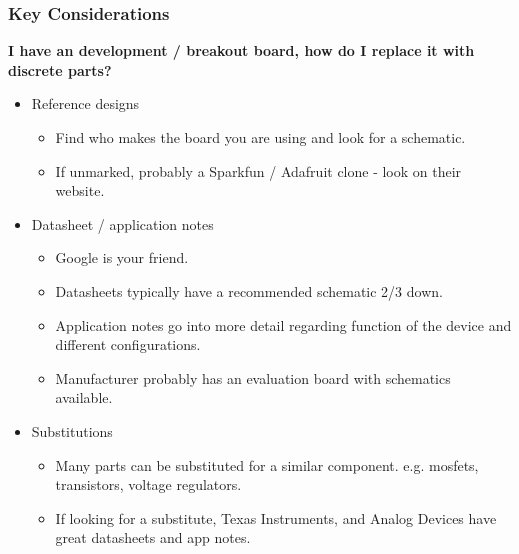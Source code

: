 \documentclass[t]{beamer}
\begin{document}
\begin{frame}
\frametitle{Key Considerations}
\large{\textbf{I have an development / breakout board, how do I replace it with discrete parts?}}
\vspace{1mm}
\begin{itemize}
	\item Reference designs 
	\begin{itemize}
		\item Find who makes the board you are using and look for a schematic.
		\item If unmarked, probably a Sparkfun / Adafruit clone - look on their website.
	\end{itemize} 
	\item Datasheet / application notes
	\begin{itemize}
		\item Google is your friend.
		\item Datasheets typically have a recommended schematic 2/3 down. 
		\item Application notes go into more detail regarding function of the device and different configurations. 
		\item Manufacturer probably has an evaluation board with schematics available.
	\end{itemize}
	\item Substitutions
	\begin{itemize}
		\item Many parts can be substituted for a similar component. e.g. mosfets, transistors, voltage regulators. 
		\item If looking for a substitute, Texas Instruments, and Analog Devices have great datasheets and app notes. 
	\end{itemize}
\end{itemize}
\end{frame}

\end{document}
